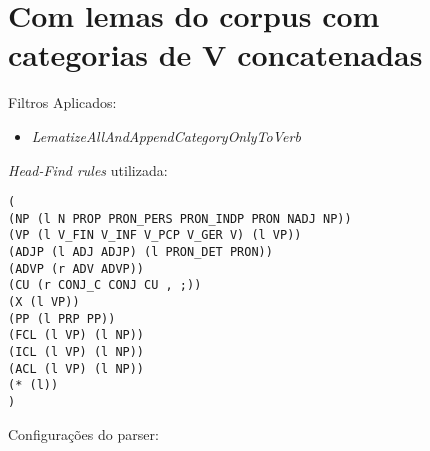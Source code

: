 \section{Com lemas do corpus com categorias de V concatenadas} %
\label{sec:exp:2009.11.23_11.17.20-lematize_all_and_append_category_only_to_verb}

Filtros Aplicados:


\begin{itemize}
  
  \item{\emph{LematizeAllAndAppendCategoryOnlyToVerb}}
  
\end{itemize}


\emph{Head-Find rules} utilizada:

\scriptsize
\begin{verbatim}
(
(NP (l N PROP PRON_PERS PRON_INDP PRON NADJ NP))
(VP (l V_FIN V_INF V_PCP V_GER V) (l VP))
(ADJP (l ADJ ADJP) (l PRON_DET PRON))
(ADVP (r ADV ADVP))
(CU (r CONJ_C CONJ CU , ;))
(X (l VP))
(PP (l PRP PP))
(FCL (l VP) (l NP))
(ICL (l VP) (l NP))
(ACL (l VP) (l NP))
(* (l))
)

\end{verbatim}

\normalsize

Configurações do parser:

